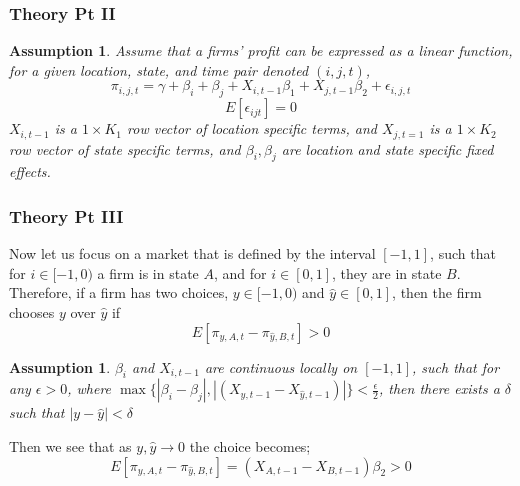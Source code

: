 \documentclass{beamer}
\newtheorem{assumption}[theorem]{Assumption}
\begin{document}
\begin{frame}
\frametitle{Theory Pt II}
\begin{assumption}
Assume that a firms' profit can be expressed as a linear function, for a given location, state, and time pair denoted $(i,j,t)$,
\begin{equation}
\pi_{i,j,t} =  \gamma+\beta_{i}+\beta_{j}+X_{i,t-1}\beta_{1}+X_{j,t-1}\beta_{2}+\epsilon_{i,j,t}
\end{equation}
\begin{equation}
E[\epsilon_{ijt}] = 0
\end{equation}
$X_{i,t-1}$ is a $1 \times K_{1}$ row vector of location specific terms, and $X_{j,t=1}$ is a $1 \times K_{2}$ row vector of state specific terms, and $\beta_{i}, \beta_{j}$ are location and state specific fixed effects.
\end{assumption}
\end{frame}

\begin{frame}
\frametitle{Theory Pt III}
Now let us focus on a market that is defined by the interval $[-1,1]$, such that for $i \in [-1,0)$ a firm is in state $A$, and for $i \in [0,1]$, they are in state $B$. Therefore, if a firm has two choices, $y \in [-1,0)$ and $\hat y \in [0,1]$, then the firm chooses $y$ over $\hat y$ if
\begin{equation}\label{diff}
E[\pi_{y,A,t}-\pi_{\hat y,B,t}] > 0
\end{equation}

\begin{assumption}\label{cont}
$\beta_{i}$ and $X_{i,t-1}$ are continuous locally on $[-1,1]$, such that for any $\epsilon > 0$, where  $\max\{|\beta_{i}-\beta_{j}|,|(X_{y,t-1}-X_{\hat y,t-1})| \} < \frac{\epsilon}{2}$, then there exists a $\delta$ such that $|y - \hat y| < \delta$
\end{assumption}

Then we see that as $y,\hat y \to 0$ the choice becomes;
$$ E[\pi_{y,A,t}-\pi_{\hat y,B,t}] = (X_{A,t-1}-X_{B,t-1})\beta_{2} > 0$$
\end{frame}
\end{document}
